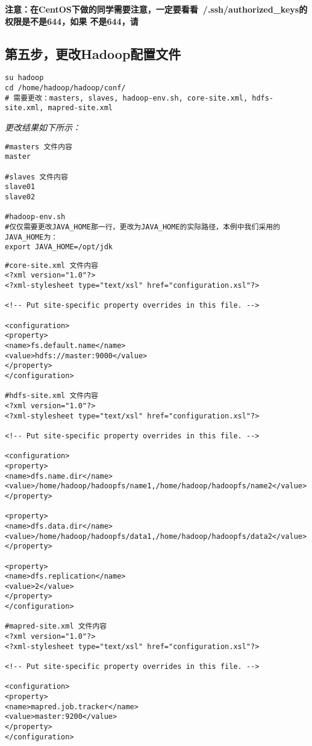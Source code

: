 \documentclass{article}
\begin{document}
\textbf{注意：在CentOS下做的同学需要注意，一定要看看~/.ssh/authorized\_keys的权限是不是644，如果
不是644，请}

\subsection{第五步，更改Hadoop配置文件}
\begin{verbatim}
su hadoop
cd /home/hadoop/hadoop/conf/
# 需要更改：masters, slaves, hadoop-env.sh, core-site.xml, hdfs-site.xml, mapred-site.xml
\end{verbatim}

\textit{更改结果如下所示：}

\begin{verbatim}
#masters 文件内容
master

#slaves 文件内容
slave01
slave02

#hadoop-env.sh
#仅仅需要更改JAVA_HOME那一行，更改为JAVA_HOME的实际路径，本例中我们采用的JAVA_HOME为：
export JAVA_HOME=/opt/jdk
\end{verbatim}

\begin{verbatim}
#core-site.xml 文件内容
<?xml version="1.0"?>
<?xml-stylesheet type="text/xsl" href="configuration.xsl"?>

<!-- Put site-specific property overrides in this file. -->

<configuration>
<property>
<name>fs.default.name</name>
<value>hdfs://master:9000</value>
</property>
</configuration>

#hdfs-site.xml 文件内容
<?xml version="1.0"?>
<?xml-stylesheet type="text/xsl" href="configuration.xsl"?>

<!-- Put site-specific property overrides in this file. -->

<configuration>
<property>
<name>dfs.name.dir</name>
<value>/home/hadoop/hadoopfs/name1,/home/hadoop/hadoopfs/name2</value>
</property>

<property>
<name>dfs.data.dir</name>
<value>/home/hadoop/hadoopfs/data1,/home/hadoop/hadoopfs/data2</value>
</property>

<property>
<name>dfs.replication</name>
<value>2</value>
</property>
</configuration>

#mapred-site.xml 文件内容
<?xml version="1.0"?>
<?xml-stylesheet type="text/xsl" href="configuration.xsl"?>

<!-- Put site-specific property overrides in this file. -->

<configuration>
<property>
<name>mapred.job.tracker</name>
<value>master:9200</value>
</property>
</configuration>
\end{verbatim}
\end{document}
